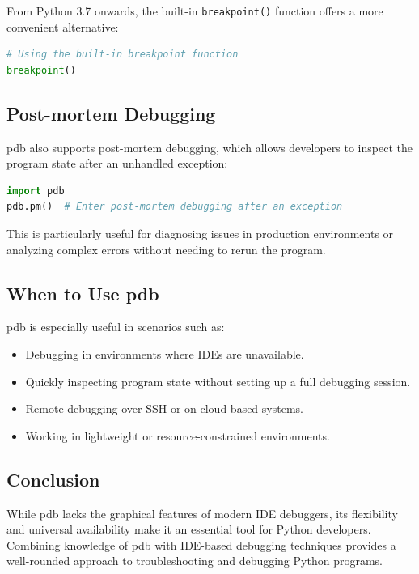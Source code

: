 \documentclass[a4paper,12pt]{article}
\begin{document}
From Python 3.7 onwards, the built-in \texttt{breakpoint()} function offers a more convenient alternative:

\begin{lstlisting}[language=Python]
# Using the built-in breakpoint function
breakpoint()
\end{lstlisting}

\subsection{Post-mortem Debugging}
pdb also supports post-mortem debugging, which allows developers to inspect the program state after an unhandled exception:

\begin{lstlisting}[language=Python]
import pdb
pdb.pm()  # Enter post-mortem debugging after an exception
\end{lstlisting}

This is particularly useful for diagnosing issues in production environments or analyzing complex errors without needing to rerun the program.

\subsection{When to Use pdb}
pdb is especially useful in scenarios such as:

\begin{itemize}
    \item Debugging in environments where IDEs are unavailable.
    \item Quickly inspecting program state without setting up a full debugging session.
    \item Remote debugging over SSH or on cloud-based systems.
    \item Working in lightweight or resource-constrained environments.
\end{itemize}

\subsection{Conclusion}
While pdb lacks the graphical features of modern IDE debuggers, its flexibility and universal availability make it an essential tool for Python developers. Combining knowledge of pdb with IDE-based debugging techniques provides a well-rounded approach to troubleshooting and debugging Python programs.
\end{document}
